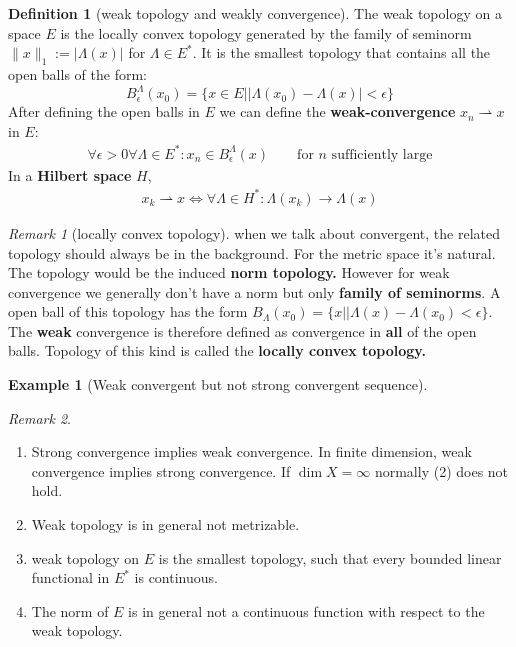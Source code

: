 \documentclass[a4paper,11pt,fleqn]{book}
\theoremstyle{definition}
\newtheorem{definition}{Definition}[section]
\newtheorem*{example}{Example}
\theoremstyle{remark}
\newtheorem*{remark}{Remark}
\begin{document}
\begin{definition}[weak topology and weakly convergence]
	 The weak topology on a space $E$ is the locally convex topology generated by the family of seminorm $\|x\|_1 := |\Lambda(x)|$ for $\Lambda \in E^*$. It is the smallest topology that contains all the open balls of the form:
	 \begin{equation*}
	 	B_\epsilon^\Lambda (x_0) = \{x \in E | |\Lambda(x_0) - \Lambda(x)| < \epsilon \}
	 \end{equation*}
	 After defining the open balls in $E$ we can define the \textbf{weak-convergence} $ x_n \rightharpoonup x$ in $E$:
	 \begin{align*}
	 	\forall \epsilon > 0 \forall \Lambda \in E^*: 
	 	x_n \in B^\Lambda_\epsilon(x) \qquad \text{for $n$ sufficiently large}
	 \end{align*} 
	In a \textbf{Hilbert space} $H$, 
	\begin{align*}
		x_k \rightharpoonup x \Leftrightarrow \forall \Lambda \in H^*: \Lambda(x_k) \rightarrow \Lambda(x)
	\end{align*}
\end{definition}
\begin{remark}[locally convex topology]
when we talk about convergent, the related topology should always be in the background. For 	the metric space it's natural. The topology would be the induced \textbf{norm topology.} However for weak convergence we generally don't have a norm but only \textbf{family of seminorms}. A open ball of this topology has the form $B_\Lambda(x_0) = \{x | |\Lambda(x) - \Lambda(x_0) < \epsilon\}$. The \textbf{weak} convergence is therefore defined as convergence in \textbf{all} of the open balls. Topology of this kind is called the \textbf{locally convex topology.}
\end{remark}

\begin{example}[Weak convergent but not strong convergent sequence]	
\end{example}

\begin{remark}\quad
\begin{enumerate}
	\item Strong  convergence implies weak convergence. In finite dimension, weak convergence implies strong convergence. If $\dim X = \infty$ normally (2) does not hold.
	\item Weak topology is in general not metrizable.
	\item weak topology on $E$ is the smallest topology, such that every bounded linear functional in $E^*$ is continuous.
	\item The norm of $E$ is in general not a continuous function with respect to the weak topology. 
\end{enumerate}
\end{remark}
\end{document}
